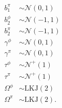 \begin{equation}
\begin{split}
    b^{\pi}_{1} &\sim \mathcal{N}(0, 1) \\
    b^{\phi}_{2} &\sim \mathcal{N}(-1, 1) \\
    b^{\pi}_{2} &\sim \mathcal{N}(-1, 1) \\
    \gamma^{\phi} &\sim \mathcal{N}(0, 1) \\
    \gamma^{\pi} &\sim \mathcal{N}(0, 1) \\
    \tau^{\phi} &\sim \mathcal{N}^{+}(1) \\
    \tau^{\pi} &\sim \mathcal{N}^{+}(1) \\
    \Omega^{\phi} &\sim \text{LKJ}(2) \\
    \Omega^{\pi} &\sim \text{LKJ}(2). \\
  \end{split}
  \label{eq:birth_death}
\end{equation}


